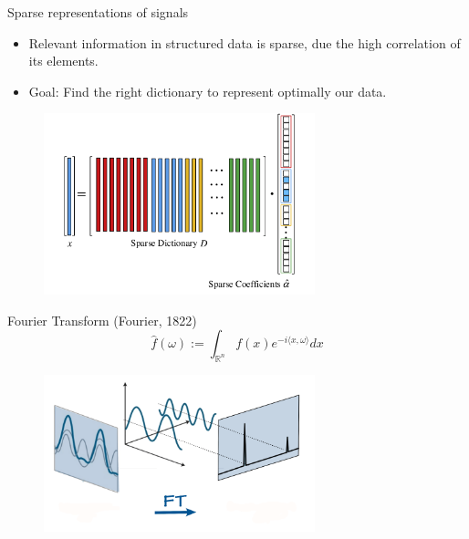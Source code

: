 \begin{frame}{Sparse representations of signals}
\begin{itemize}
 \item Relevant information in structured data is sparse, due the high correlation of its elements.\pause
 \item Goal: Find the right dictionary to represent optimally our data.
\end{itemize}
\begin{figure}[h!]
\centering
\includegraphics[width=0.7\textwidth]{./Images/sparse_data.png}
\end{figure}
\end{frame}

\begin{frame}{Fourier Transform (Fourier, 1822)}
$$
\hat{f}(\omega):=\int_{\mathbb{R}^n} f(x)e^{-i\langle x,\omega\rangle} dx
$$
\pause
\begin{figure}[h!]
\centering
\includegraphics[width=0.7\textwidth]{./Images/fourier.png}
\end{figure}
\end{frame}

